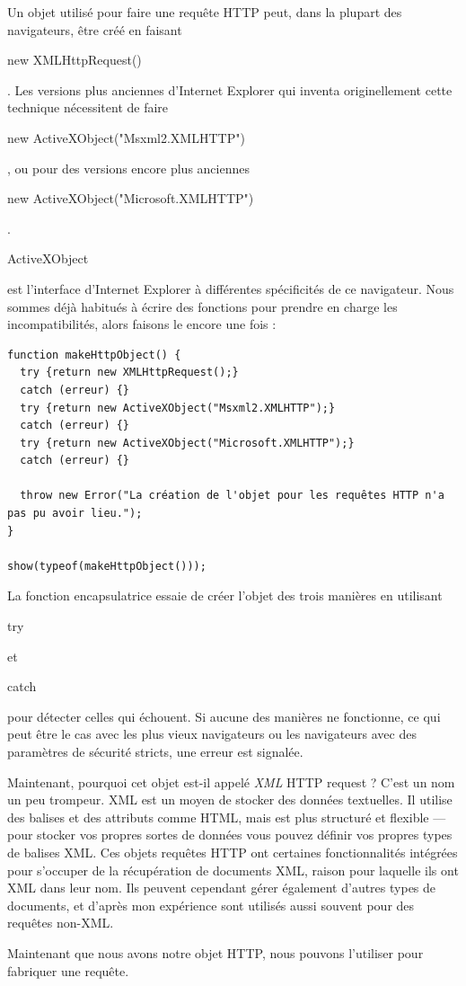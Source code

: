 \documentclass{FramateX}
\renewcommand{\texttt}[1]{\begin{sffamily}{#1}\end{sffamily}}
\begin{document}
\begin{center}\end{center}

Un objet utilisé pour faire une requête HTTP peut, dans la plupart des
navigateurs, être créé en faisant \texttt{new XMLHttpRequest()}. Les
versions plus anciennes d'Internet Explorer qui inventa originellement
cette technique nécessitent de faire
\texttt{new ActiveXObject("Msxml2.XMLHTTP")}, ou pour des versions
encore plus anciennes \texttt{new ActiveXObject("Microsoft.XMLHTTP")}.
\texttt{ActiveXObject} est l'interface d'Internet Explorer à différentes
spécificités de ce navigateur. Nous sommes déjà habitués à écrire des
fonctions pour prendre en charge les incompatibilités, alors faisons le
encore une fois :

\begin{lstlisting}
function makeHttpObject() {
  try {return new XMLHttpRequest();}
  catch (erreur) {}
  try {return new ActiveXObject("Msxml2.XMLHTTP");}
  catch (erreur) {}
  try {return new ActiveXObject("Microsoft.XMLHTTP");}
  catch (erreur) {}

  throw new Error("La création de l'objet pour les requêtes HTTP n'a pas pu avoir lieu.");
}

show(typeof(makeHttpObject()));
\end{lstlisting}
La fonction encapsulatrice essaie de créer l'objet des trois manières en
utilisant \texttt{try} et \texttt{catch} pour détecter celles qui
échouent. Si aucune des manières ne fonctionne, ce qui peut être le cas
avec les plus vieux navigateurs ou les navigateurs avec des paramètres
de sécurité stricts, une erreur est signalée.

Maintenant, pourquoi cet objet est-il appelé \emph{XML} HTTP request ?
C'est un nom un peu trompeur. XML est un moyen de stocker des données
textuelles. Il utilise des balises et des attributs comme HTML, mais est
plus structuré et flexible --- pour stocker vos propres sortes de
données vous pouvez définir vos propres types de balises XML. Ces objets
requêtes HTTP ont certaines fonctionnalités intégrées pour s'occuper de
la récupération de documents XML, raison pour laquelle ils ont XML dans
leur nom. Ils peuvent cependant gérer également d'autres types de
documents, et d'après mon expérience sont utilisés aussi souvent pour
des requêtes non-XML.

\begin{center}\end{center}

Maintenant que nous avons notre objet HTTP, nous pouvons l'utiliser pour
fabriquer une requête.
\end{document}
